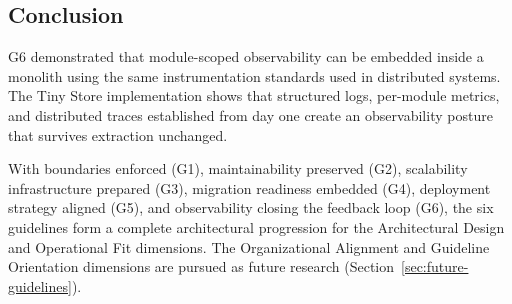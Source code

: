 \subsection*{Conclusion}

G6 demonstrated that module-scoped observability can be embedded inside a monolith using the same instrumentation standards used in distributed systems. The Tiny Store implementation shows that structured logs, per-module metrics, and distributed traces established from day one create an observability posture that survives extraction unchanged.

With boundaries enforced (G1), maintainability preserved (G2), scalability infrastructure prepared (G3), migration readiness embedded (G4), deployment strategy aligned (G5), and observability closing the feedback loop (G6), the six guidelines form a complete architectural progression for the Architectural Design and Operational Fit dimensions. The Organizational Alignment and Guideline Orientation dimensions are pursued as future research (Section~\ref{sec:future-guidelines}).
